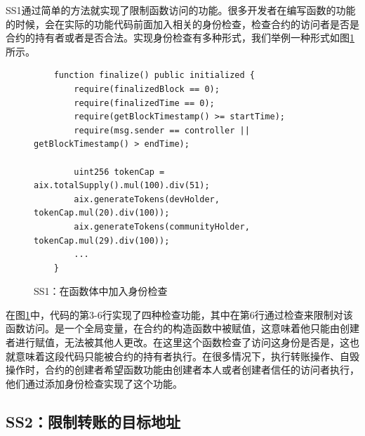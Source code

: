 SS1通过简单的方法就实现了限制函数访问的功能。很多开发者在编写函数的功能的时候，会在实际的功能代码前面加入相关的身份检查，检查合约的访问者是否是合约的持有者或者是否合法。实现身份检查有多种形式，我们举例一种形式如图\ref{fig:ss1_example}所示。
\begin{figure}
\begin{minipage}[htbp]{1.0\linewidth}
    \begin{lstlisting}
    function finalize() public initialized {
        require(finalizedBlock == 0);
        require(finalizedTime == 0);
        require(getBlockTimestamp() >= startTime);
        require(msg.sender == controller || getBlockTimestamp() > endTime);

        uint256 tokenCap = aix.totalSupply().mul(100).div(51);
        aix.generateTokens(devHolder, tokenCap.mul(20).div(100));
        aix.generateTokens(communityHolder, tokenCap.mul(29).div(100));
        ...
    }
    \end{lstlisting}
\end{minipage}
\vspace{-5mm}
\caption{SS1：在函数体中加入身份检查}
\label{fig:ss1_example}
\end{figure}
在图\ref{fig:ss1_example}中，代码的第3-6行实现了四种检查功能，其中在第6行通过检查来限制对该函数访问。是一个全局变量，在合约的构造函数中被赋值，这意味着他只能由创建者进行赋值，无法被其他人更改。在这里这个函数检查了访问这身份是否是，这也就意味着这段代码只能被合约的持有者执行。在很多情况下，执行转账操作、自毁操作时，合约的创建者希望函数功能由创建者本人或者创建者信任的访问者执行，他们通过添加身份检查实现了这个功能。
\subsection{SS2：限制转账的目标地址}

